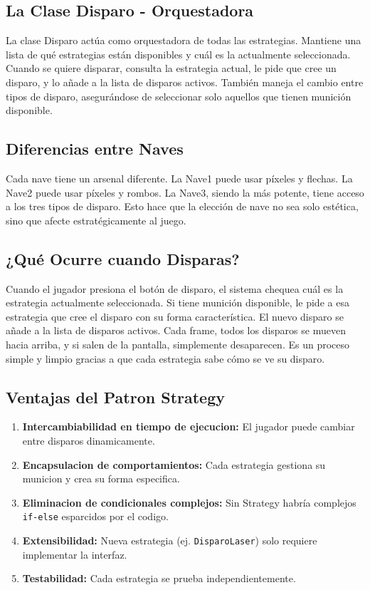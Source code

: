 \documentclass[12pt]{article}
\begin{document}
\subsection{La Clase Disparo - Orquestadora}

La clase Disparo actúa como orquestadora de todas las estrategias. Mantiene una lista de qué estrategias están disponibles y cuál es la actualmente seleccionada. Cuando se quiere disparar, consulta la estrategia actual, le pide que cree un disparo, y lo añade a la lista de disparos activos. También maneja el cambio entre tipos de disparo, asegurándose de seleccionar solo aquellos que tienen munición disponible.

\subsection{Diferencias entre Naves}

Cada nave tiene un arsenal diferente. La Nave1 puede usar píxeles y flechas. La Nave2 puede usar píxeles y rombos. La Nave3, siendo la más potente, tiene acceso a los tres tipos de disparo. Esto hace que la elección de nave no sea solo estética, sino que afecte estratégicamente al juego.

\subsection{¿Qué Ocurre cuando Disparas?}

Cuando el jugador presiona el botón de disparo, el sistema chequea cuál es la estrategia actualmente seleccionada. Si tiene munición disponible, le pide a esa estrategia que cree el disparo con su forma característica. El nuevo disparo se añade a la lista de disparos activos. Cada frame, todos los disparos se mueven hacia arriba, y si salen de la pantalla, simplemente desaparecen. Es un proceso simple y limpio gracias a que cada estrategia sabe cómo se ve su disparo.

\subsection{Ventajas del Patron Strategy}

\begin{enumerate}
    \item \textbf{Intercambiabilidad en tiempo de ejecucion:} El jugador puede cambiar entre disparos dinamicamente.
    
    \item \textbf{Encapsulacion de comportamientos:} Cada estrategia gestiona su municion y crea su forma especifica.
    
    \item \textbf{Eliminacion de condicionales complejos:} Sin Strategy habría complejos \texttt{if-else} esparcidos por el codigo.
    
    \item \textbf{Extensibilidad:} Nueva estrategia (ej. \texttt{DisparoLaser}) solo requiere implementar la interfaz.
    
    \item \textbf{Testabilidad:} Cada estrategia se prueba independientemente.
\end{enumerate}
\end{document}
